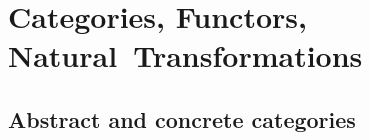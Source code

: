 \chapter{Categories, Functors, Natural~Transformations}

\section{Abstract and concrete categories}


